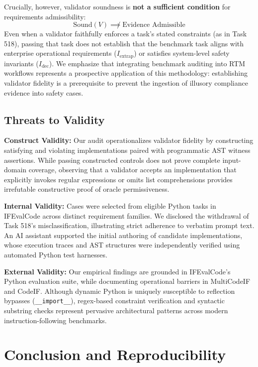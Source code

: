 \documentclass[runningheads]{llncs}
\begin{document}
Crucially, however, validator soundness is \textbf{not a sufficient condition} for requirements admissibility:
\begin{equation}
\label{eq:insufficient_condition}
\text{Sound}(V) \not\implies \text{Evidence Admissible}
\end{equation}
Even when a validator faithfully enforces a task's stated constraints (as in Task 518), passing that task does not establish that the benchmark task aligns with enterprise operational requirements ($I_{\text{extrap}}$) or satisfies system-level safety invariants ($I_{\text{dec}}$). We emphasize that integrating benchmark auditing into RTM workflows represents a prospective application of this methodology: establishing validator fidelity is a prerequisite to prevent the ingestion of illusory compliance evidence into safety cases.

\subsection{Threats to Validity}
\textbf{Construct Validity:} Our audit operationalizes validator fidelity by constructing satisfying and violating implementations paired with programmatic AST witness assertions. While passing constructed controls does not prove complete input-domain coverage, observing that a validator accepts an implementation that explicitly invokes regular expressions or omits list comprehensions provides irrefutable constructive proof of oracle permissiveness.

\textbf{Internal Validity:} Cases were selected from eligible Python tasks in IFEvalCode across distinct requirement families. We disclosed the withdrawal of Task 518's misclassification, illustrating strict adherence to verbatim prompt text. An AI assistant supported the initial authoring of candidate implementations, whose execution traces and AST structures were independently verified using automated Python test harnesses.

\textbf{External Validity:} Our empirical findings are grounded in IFEvalCode's Python evaluation suite, while documenting operational barriers in MultiCodeIF and CodeIF. Although dynamic Python is uniquely susceptible to reflection bypasses (\texttt{\_\_import\_\_}), regex-based constraint verification and syntactic substring checks represent pervasive architectural patterns across modern instruction-following benchmarks.

\section{Conclusion and Reproducibility}
\label{sec:conclusion}
\end{document}
